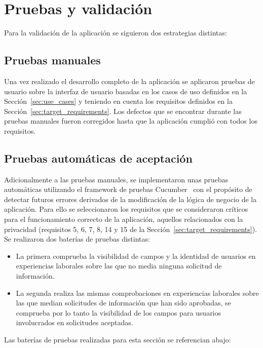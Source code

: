 \documentclass[a4paper, 12pt]{book}
\begin{document}
    \cleardoublepage


    \chapter{Pruebas y validación}
    Para la validación de la aplicación se siguieron dos estrategias distintas:


    \section{Pruebas manuales}
    \label{sec:manual_tests}
    Una vez realizado el desarrollo completo de la aplicación se aplicaron pruebas de usuario sobre la interfaz de usuario
    basadas en los casos de uso definidos en la Sección~\ref{sec:use_cases} y teniendo en cuenta los requisitos definidos
    en la Sección~\ref{sec:target_requirements}. Los defectos que se encontrar durante las pruebas manuales fueron corregidos
    hasta que la aplicación cumplió con todos los requisitos.


    \section{Pruebas automáticas de aceptación}
    \label{sec:acceptance_tests}
    Adicionalmente a las pruebas manuales, se implementaron unas pruebas automáticas utilizando el framework de pruebas Cucumber~\cite{bib:cucumber}
    con el propósito de detectar futuros errores derivados de la modificación de la lógica de negocio de la aplicación.
    Para ello se seleccionaron los requisitos que se consideraron críticos para el funcionamiento correcto de la aplicación,
    aquellos relacionados con la privacidad (requisitos 5, 6, 7, 8, 14 y 15 de la Sección~\ref{sec:target_requirements}).
    Se realizaron dos baterías de pruebas distintas:
    \begin{itemize}
        \item La primera comprueba la visibilidad de campos y la identidad de usuarios en experiencias laborales
        sobre las que no media ninguna solicitud de información.
        \item La segunda realiza las mismas comprobaciones en experiencias laborales sobre las que median solicitudes
        de información que han sido aprobadas, se comprueba por lo tanto la visibilidad de los campos para usuarios
        involucrados en solicitudes aceptadas.
    \end{itemize}

    Las baterías de pruebas realizadas para esta sección se referencian abajo:
\end{document}
